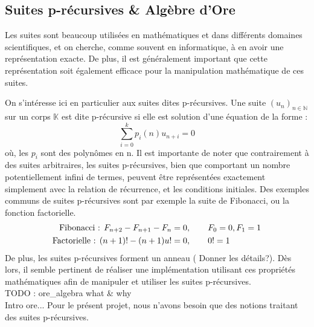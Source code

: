 \documentclass[12pt]{article}
\begin{document}
    \subsection{Suites p-récursives \& Algèbre d'Ore}
        \label{sec:prec}
        \par Les suites sont beaucoup utilisées en mathématiques et dans différents domaines
        scientifiques, et on cherche, comme souvent en informatique, à en avoir une
        représentation exacte. De plus, il est généralement important que cette représentation
        soit également efficace pour la manipulation mathématique de ces suites.
        \par On s'intéresse ici en particulier aux suites dites p-récursives.
        Une suite $(u_n)_{n\in\mathbb N}$ sur un corps $\mathbb K$ est dite p-récursive
        si elle est solution d'une équation de la forme :
        \begin{equation}
            \sum_{i=0}^k p_i(n) u_{n+i} = 0
        \end{equation}
        où, les $p_i$ sont des polynômes en n. Il est importante de noter que contrairement
        à des suites arbitraires, les suites p-récursives, bien que comportant un nombre
        potentiellement infini de termes, peuvent être représentées exactement simplement
        avec la relation de récurrence, et les conditions initiales.
        Des exemples communs de suites p-récursives
        sont par exemple la suite de Fibonacci, ou la fonction factorielle.
        \begin{align*}
            \textnormal{Fibonacci : } F_{n+2} - F_{n+1} - F_n &= 0, \qquad F_0=0, F_1=1\\
            \textnormal{Factorielle : } (n+1)! - (n+1)u! &= 0, \qquad 0!=1
        \end{align*}
        De plus, les suites p-récursives forment un anneau ({\color{red} Donner les détails?}).
        Dès lors, il semble pertinent
        de réaliser une implémentation utilisant ces propriétés mathématiques afin de
        manipuler et utiliser les suites p-récursives.\\
        {\color{red} TODO : ore\_algebra what \& why\\ Intro ore...} Pour le présent projet,
        nous n'avons besoin que des notions traitant des suites p-récursives.
\end{document}
